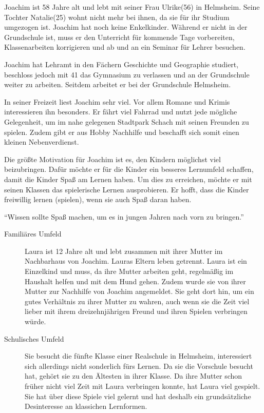 \begin{description}
\begin{description}
			\item[Familiäres Umfeld]{Joachim ist 58 Jahre alt und lebt mit seiner Frau Ulrike(56) in Helmsheim. Seine Tochter Natalie(25) wohnt nicht mehr bei ihnen, da sie für ihr Studium umgezogen ist. Joachim hat noch keine Enkelkinder. Während er nicht in der Grundschule ist, muss er den Unterricht für kommende Tage vorbereiten, Klassenarbeiten korrigieren und ab und an ein Seminar für Lehrer besuchen.}
			\item[Schulisches Umfeld]{Joachim hat Lehramt in den Fächern Geschichte und Geographie studiert, beschloss jedoch mit 41 das Gymnasium zu verlassen und an der Grundschule weiter zu arbeiten. Seitdem arbeitet er bei der Grundschule Helmsheim.}
			\item[Interessen und Hobbys]{In seiner Freizeit liest Joachim sehr viel. Vor allem Romane und Krimis interessieren ihn besonders. Er fährt viel Fahrrad und nutzt jede mögliche Gelegenheit, um im nahe gelegenen Stadtpark Schach mit seinen Freunden zu spielen. Zudem gibt er aus Hobby Nachhilfe und beschafft sich somit einen kleinen Nebenverdienst.}
			\item[Motivation]{Die größte Motivation für Joachim ist es, den Kindern möglichst viel beizubringen. Dafür möchte er für die Kinder ein besseres Lernumfeld schaffen, damit die Kinder Spaß am Lernen haben. Um dies zu erreichen, möchte er mit seinen Klassen das spielerische Lernen ausprobieren. Er hofft, dass die Kinder freiwillig lernen (spielen), wenn sie auch Spaß daran haben.}
			\item{\enquote{Wissen sollte Spaß machen, um es in jungen Jahren nach vorn zu bringen.}}
		\end{description}
		\item[Laura Dietz: Die Rennfahrerin]<TODO: Bild>\hfill
		\begin{description}
			\item[Familiäres Umfeld]{Laura ist 12 Jahre alt und lebt zusammen mit ihrer Mutter im Nachbarhaus von Joachim. Lauras Eltern leben getrennt. Laura ist ein Einzelkind und muss, da ihre Mutter arbeiten geht, regelmäßig im Haushalt helfen und mit dem Hund gehen. Zudem wurde sie von ihrer Mutter zur Nachhilfe von Joachim angemeldet. Sie geht dort hin, um ein gutes Verhältnis zu ihrer Mutter zu wahren, auch wenn sie die Zeit viel lieber mit ihrem dreizehnjährigen Freund und ihren Spielen verbringen würde.}
			\item[Schulisches Umfeld]{Sie besucht die fünfte Klasse einer Realschule in Helmsheim, interessiert sich allerdings nicht sonderlich fürs Lernen. Da sie die Vorschule besucht hat, gehört sie zu den Ältesten in ihrer Klasse. Da ihre Mutter schon früher nicht viel Zeit mit Laura verbringen konnte, hat Laura viel gespielt. Sie hat über diese Spiele viel gelernt und hat deshalb ein grundsätzliche Desinteresse an klassichen Lernformen.}

\end{description}
\end{description}

